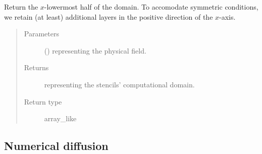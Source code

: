 \documentclass[letterpaper,10pt,english]{sphinxmanual}
\begin{document}
\begin{fulllineitems}
\begin{fulllineitems}
\end{fulllineitems}


\begin{fulllineitems}
\label{\detokenize{api:dycore.horizontal_boundary.RelaxedSymmetricYZ.from_physical_to_computational_domain}}
Return the \(x\)-lowermost half of the domain. To accomodate symmetric conditions,
we retain (at least)  additional layers in the positive direction of the \(x\)-axis.
\begin{quote}\begin{description}
\item[{Parameters}] \leavevmode
{} () \textendash{}  representing the physical field.

\item[{Returns}] \leavevmode
{} representing the stencils’ computational domain.

\item[{Return type}] \leavevmode
array\_like

\end{description}\end{quote}

\end{fulllineitems}


\end{fulllineitems}



\subsection{Numerical diffusion}
\label{\detokenize{api:numerical-diffusion}}
\end{document}
